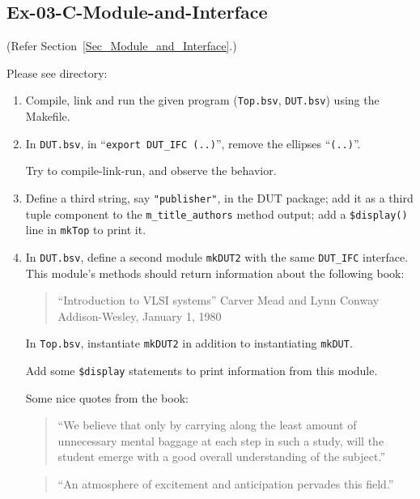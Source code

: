 
\subsection*{Ex-03-C-Module-and-Interface}
\label{Ex-03-C-Module-and-Interface}

(Refer Section~\ref{Sec_Module_and_Interface}.)

Please see directory: 

\begin{enumerate}

  \item Compile, link and run the given program (\verb|Top.bsv|,
    \verb|DUT.bsv|) using the Makefile.

  \item In \verb|DUT.bsv|, in ``\verb|export DUT_IFC (..)|'', remove
    the ellipses ``\verb|(..)|''.

    Try to compile-link-run, and observe the behavior.

  \item Define a third string, say \verb|"publisher"|, in the DUT
    package; add it as a third tuple component to the
    \verb|m_title_authors| method output; add a \verb|$display()| line
    in \verb|mkTop| to print it.

  \item In \verb|DUT.bsv|, define a second module \verb|mkDUT2| with
    the same \verb|DUT_IFC| interface.  This module's methods should
    return information about the following book:

    \begin{quote}
      ``Introduction to VLSI systems''
      Carver Mead and Lynn Conway
      Addison-Wesley, January 1, 1980
    \end{quote}

    In \verb|Top.bsv|, instantiate \verb|mkDUT2| in addition to
    instantiating \verb|mkDUT|.

    Add some \verb|$display| statements to print information from this
    module.

    Some nice quotes from the book:

    \begin{quote}
      ``We believe that only by carrying along the least amount of
        unnecessary mental baggage at each step in such a study, will
        the student emerge with a good overall understanding of the
        subject.''
    \end{quote}
	

    \begin{quote}
      ``An atmosphere of excitement and anticipation pervades this field.''
    \end{quote}

\end{enumerate}

